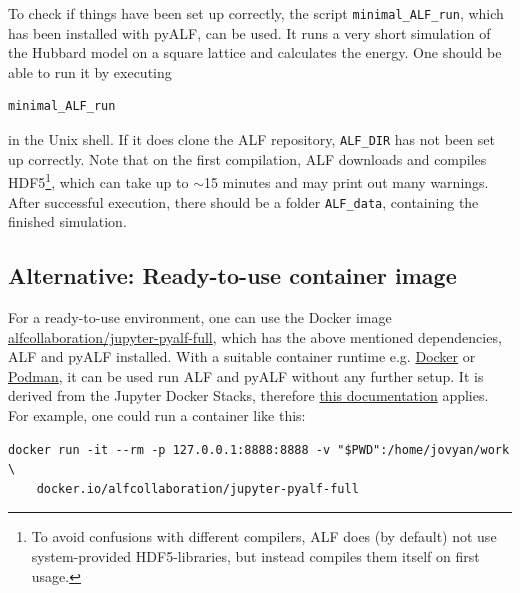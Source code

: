 \documentclass[10pt,modern]{scrartcl}
\numberwithin{exerciseitem}{exercise} %
\begin{document}
To check if things have been set up correctly, the script \verb|minimal_ALF_run|, which has been installed with pyALF, can be used. It runs a very short simulation of the Hubbard model on a square lattice and calculates the energy.
One should be able to run it by executing
\begin{lstlisting}[style=bash]
minimal_ALF_run
\end{lstlisting}
in the Unix shell. If it does clone the ALF repository, \verb|ALF_DIR| has not been set up correctly. Note that on the first compilation, ALF downloads and compiles HDF5\footnote{To avoid confusions with different compilers, ALF does (by default) not use system-provided HDF5-libraries, but instead compiles them itself on first usage.}, which can take up to $\sim$15 minutes and may print out many warnings. After successful execution, there should be a folder \verb|ALF_data|, containing the finished simulation.

\subsection{Alternative: Ready-to-use container image}

For a ready-to-use environment, one can use the Docker image \href{https://hub.docker.com/r/alfcollaboration/jupyter-pyalf-full}{alfcollaboration/jupyter-pyalf-full}, which has the above mentioned dependencies, ALF and pyALF installed. With a suitable container runtime e.g. \href{https://www.docker.com/}{Docker} or \href{https://podman.io/}{Podman}, it can be used run ALF and pyALF without any further setup. It is derived from the Jupyter Docker Stacks, therefore \href{https://jupyter-docker-stacks.readthedocs.io}{this documentation} applies. For example, one could run a container like this:

\begin{lstlisting}[style=bash]
docker run -it --rm -p 127.0.0.1:8888:8888 -v "$PWD":/home/jovyan/work \
    docker.io/alfcollaboration/jupyter-pyalf-full
\end{lstlisting}
\end{document}
